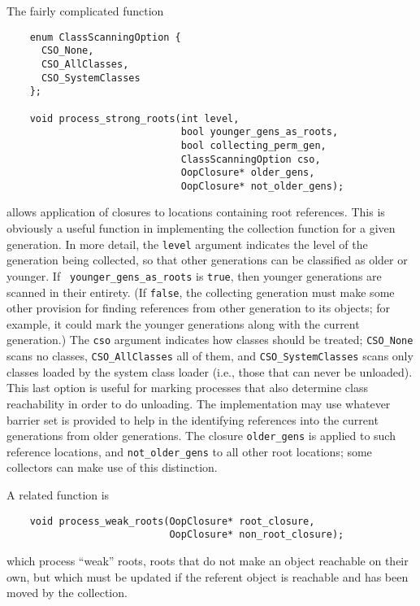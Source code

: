 \documentclass{article}
\begin{document}
The fairly complicated function
\begin{verbatim}
    enum ClassScanningOption {
      CSO_None,
      CSO_AllClasses,
      CSO_SystemClasses
    };

    void process_strong_roots(int level,
                              bool younger_gens_as_roots,
                              bool collecting_perm_gen,
                              ClassScanningOption cso,
                              OopClosure* older_gens,
                              OopClosure* not_older_gens);
\end{verbatim}
allows application of closures to locations containing root references.
This is obviously a useful function in implementing the collection
function for a given generation.  In more detail, the {\tt level}
argument indicates the level of the generation being collected, so
that other generations can be classified as older or younger.  If {\tt
younger\_gens\_as\_roots} is {\tt true}, then younger generations are
scanned in their entirety.  (If {\tt false}, the collecting generation
must make some other provision for finding references from other
generation to its objects; for
example, it could mark the younger generations along with the current
generation.)  The {\tt cso} argument indicates how classes should be
treated; {\tt CSO\_None} scans no classes, {\tt CSO\_AllClasses} all of
them, and {\tt CSO\_SystemClasses} scans only classes loaded by the
system class loader (i.e., those that can never be unloaded).  This
last option is useful for marking processes that also determine class
reachability in order to do unloading.  The implementation may use
whatever barrier set is provided to help in the identifying references
into the current generations from older generations.  The closure
{\tt older\_gens} is applied to such reference locations, and 
{\tt not\_older\_gens} to all other root locations; some collectors can
make use of this distinction.

A related function is
\begin{verbatim}
    void process_weak_roots(OopClosure* root_closure,
                            OopClosure* non_root_closure);
\end{verbatim}
which process ``weak'' roots, roots that do not make an object
reachable on their own, but which must be updated if the referent
object is reachable and has been moved by the collection.
\end{document}
